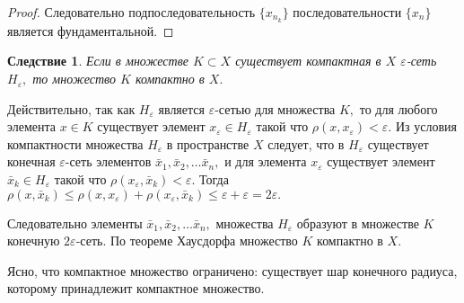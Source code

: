 \documentclass[12pt,a4paper,titlepage,oneside]{book}
\theoremstyle{definition}
\theoremstyle{plain}
\theoremstyle{break}
\theoremstyle{remark}
\theoremstyle{remark}
\theoremstyle{remark}
\theoremstyle{remark}
\theoremstyle{plain}
\theoremstyle{plain}
\newtheorem*{corollary}{Следствие}
\begin{document}
\begin{proof}
Следовательно подпоследовательность $\{x_{n_k}\}$ последовательности $\{x_n\}$ является фундаментальной.
\end{proof}

\begin{corollary}
Если в множестве $K \subset X$ существует компактная в $X$ $\varepsilon$-сеть $H_{\varepsilon},$ то множество $K$ компактно в $X.$ 
\end{corollary}

Действительно, так как $H_{\varepsilon} $ является $\varepsilon$-сетью для множества $K,$ то для любого элемента $x \in K$ существует элемент $x_{\varepsilon} \in H_{\varepsilon}$ такой что $\rho(x, x_{\varepsilon}) < \varepsilon.$ Из условия компактности множества $H_{\varepsilon}$ в пространстве $X$ следует, что в  $H_{\varepsilon}$ существует конечная $\varepsilon$-сеть элементов $\bar{x}_1, \bar{x}_2,\ldots \bar{x}_n,$ и для элемента $x_{\varepsilon}$ существует элемент $\bar{x}_k \in H_{\varepsilon}$ такой что $\rho(x_{\varepsilon}, \bar{x}_k) < \varepsilon.$ Тогда $\rho(x, \bar{x}_k) \leqslant \rho(x, x_{\varepsilon}) + \rho(x_{\varepsilon}, \bar{x}_k) \leqslant \varepsilon + \varepsilon = 2 \varepsilon.$

Следовательно элементы $\bar{x}_1, \bar{x}_2,\ldots \bar{x}_n,$ множества $H_{\varepsilon}$ образуют в множестве $K$ конечную $2 \varepsilon$-сеть. По теореме Хаусдорфа множество $K$ компактно в $X.$

Ясно, что компактное множество ограничено: существует шар конечного радиуса, которому принадлежит компактное множество.
\end{document}
